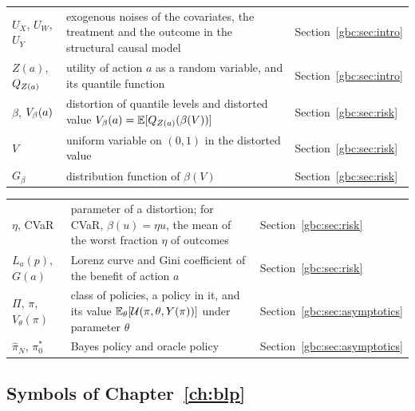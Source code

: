 {\noindent\small\centering
\setlength{\tabcolsep}{4pt}\renewcommand{\arraystretch}{1.1}
\begin{tabular}{>{\raggedright\arraybackslash}p{1.0in}>{\raggedright\arraybackslash}p{2.15in}>{\raggedright\arraybackslash}p{0.95in}}
$U_X$, $U_W$, $U_Y$ & exogenous noises of the covariates, the treatment and the outcome in the structural causal model & Section~\ref{gbc:sec:intro} \\
$Z(a)$, $Q_{Z(a)}$ & utility of action $a$ as a random variable, and its quantile function & Section~\ref{gbc:sec:intro} \\
$\beta$, $V_{\beta}(a)$ & distortion of quantile levels and distorted value $V_{\beta}(a) = \mathbb{E}[Q_{Z(a)}(\beta(V))]$ & Section~\ref{gbc:sec:risk} \\
$V$ & uniform variable on $(0, 1)$ in the distorted value & Section~\ref{gbc:sec:risk} \\
$G_\beta$ & distribution function of $\beta(V)$ & Section~\ref{gbc:sec:risk} \\
\end{tabular}\par}

{\noindent\small\centering
\setlength{\tabcolsep}{4pt}\renewcommand{\arraystretch}{1.1}
\begin{tabular}{>{\raggedright\arraybackslash}p{1.0in}>{\raggedright\arraybackslash}p{2.15in}>{\raggedright\arraybackslash}p{0.95in}}
$\eta$, CVaR & parameter of a distortion; for CVaR, $\beta(u) = \eta u$, the mean of the worst fraction $\eta$ of outcomes & Section~\ref{gbc:sec:risk} \\
$L_a(p)$, $G(a)$ & Lorenz curve and Gini coefficient of the benefit of action $a$ & Section~\ref{gbc:sec:risk} \\
$\Pi$, $\pi$, $V_\theta(\pi)$ & class of policies, a policy in it, and its value $\mathbb{E}_\theta[\mathcal{U}(\pi, \theta, Y(\pi))]$ under parameter $\theta$ & Section~\ref{gbc:sec:asymptotics} \\
$\hat\pi_N$, $\pi_0^*$ & Bayes policy and oracle policy & Section~\ref{gbc:sec:asymptotics} \\
\bottomrule
\end{tabular}\par}

\subsection*{Symbols of Chapter~\ref{ch:blp}}



